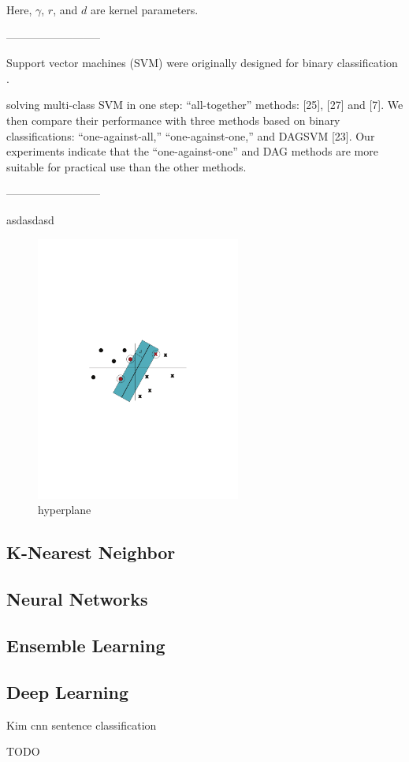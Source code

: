 Here, $\gamma$, $r$, and $d$ are kernel parameters.

--------------------------

Support vector machines (SVM) were originally designed for binary classification \cite{hsu2002comparison}.

solving multi-class SVM in one step: “all-together” methods: [25], [27] and [7]. We then compare their performance with three methods based on binary classifications: “one-against-all,” “one-against-one,” and DAGSVM [23]. Our experiments indicate that the “one-against-one” and DAG methods are more suitable for practical use than the other methods. 

--------------------------

asdasdasd \cite{berwick2003idiot}

\begin{figure}[!htp]
  \center
  \includegraphics[width=0.6\textwidth]{figures/hyperplane}
  \caption{hyperplane}
  \label{fig:hyperplane}
\end{figure}

\subsection{K-Nearest Neighbor}

\subsection{Neural Networks}

\fi

\subsection{Ensemble Learning}
\label{subsec:ensemble_learning]}

\cite{ensemble2009Polikar}

\subsection{Deep Learning}
\label{subsec:deep_learning}

Kim \acrfull{cnn} sentence classification \cite{kim2014convolutional}

TODO